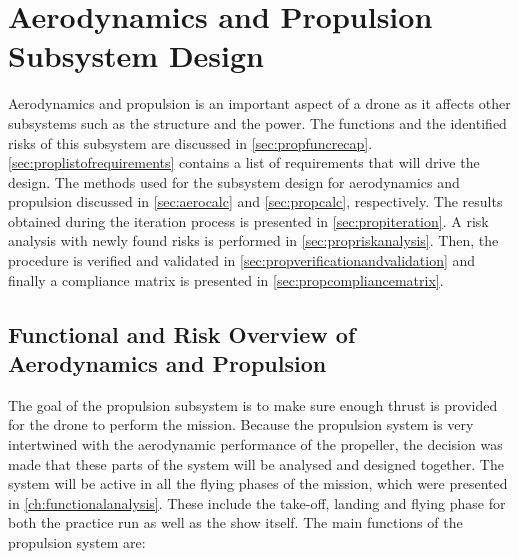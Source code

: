 \chapter{Aerodynamics and Propulsion Subsystem Design}
\label{ch:propulsion}

Aerodynamics and propulsion is an important aspect of a drone as it affects other subsystems such as the structure and the power. The functions and the identified risks of this subsystem are discussed in \autoref{sec:propfuncrecap}. \autoref{sec:proplistofrequirements} contains a list of requirements that will drive the design. The methods used for the subsystem design for aerodynamics and propulsion discussed in \autoref{sec:aerocalc} and \autoref{sec:propcalc}, respectively. The results obtained during the iteration process is presented in \autoref{sec:propiteration}. A risk analysis with newly found risks is performed in \autoref{sec:propriskanalysis}. Then, the procedure is verified and validated in \autoref{sec:propverificationandvalidation} and finally a compliance matrix is presented in \autoref{sec:propcompliancematrix}.



    
% 

\section{Functional and Risk Overview of Aerodynamics and Propulsion}
\label{sec:propfuncrecap}

The goal of the propulsion subsystem is to make sure enough thrust is provided for the drone to perform the mission. Because the propulsion system is very intertwined with the aerodynamic performance of the propeller, the decision was made that these parts of the system will be analysed and designed together. The system will be active in all the flying phases of the mission, which were presented in \autoref{ch:functionalanalysis}. These include the take-off, landing and flying phase for both the practice run as well as the show itself. The main functions of the propulsion system are:

